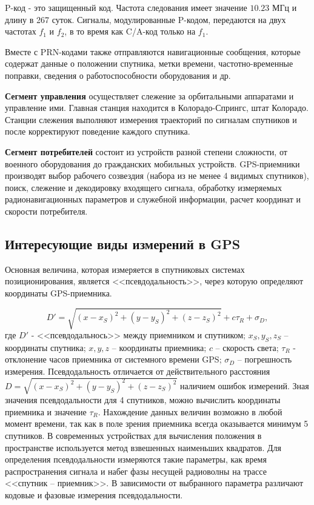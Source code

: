 \documentclass[14pt]{article}
\begin{document}
P-код - это защищенный код. Частота следования имеет значение $10.23 \text{ МГц}$ и длину в 267 суток. Сигналы, модулированные P-кодом, передаются на двух частотах $f_1$ и $f_2$, в то время как C/A-код только на $f_1$.

Вместе с PRN-кодами также отправляются навигационные сообщения, которые содержат данные о положении спутника, метки времени, частотно-временные поправки, сведения о работоспособности оборудования и др.

\textbf{Сегмент управления} осуществляет слежение за орбитальными аппаратами и управление ими. Главная станция находится в Колорадо-Спрингс, штат Колорадо. Станции слежения выполняют измерения траекторий по сигналам спутников и после корректируют поведение каждого спутника.

\textbf{Сегмент потребителей} состоит из устройств разной степени сложности, от военного оборудования до гражданских мобильных устройств. GPS-приемники производят выбор рабочего созвездия (набора из не менее 4 видимых спутников), поиск, слежение и декодировку входящего сигнала, обработку измеряемых радионавигационных параметров и служебной информации, расчет координат и скорости потребителя.

\subsection{Интересующие виды измерений в GPS}
Основная величина, которая измеряется в спутниковых системах позиционирования, является <<псевдодальность>>, через которую определяют координаты GPS-приемника.

\begin{equation}
D' = \sqrt{(x - x_S)^2 + (y - y_S)^2 + (z - z_S)^2} + c\tau_R +\sigma_D,
\end{equation}
где $D'$ - <<псевдодальнось>> между приемником и спутником; $x_S, y_S, z_S$ -- координаты спутника; $x, y, z$ -- координаты приемника; $c$ -- скорость света; $\tau_R$ - отклонение часов приемника от системного времени GPS; $\sigma_D$ -- погрешность измерения. 
Псевдодальность отличается от действительного расстояния $D = \sqrt{(x - x_S) ^ 2 + (y - y_S) ^ 2 + (z - z_S) ^ 2}$ наличием ошибок измерений. 
Зная значения псевдодальности для 4 спутников, можно вычислить координаты приемника и значение $\tau_R$. Нахождение данных величин возможно в любой момент времени, так как в поле зрения приемника всегда оказывается минимум 5 спутников. В современных устройствах для вычисления положения в пространстве используется метод взвешенных наименьших квадратов. Для определения псевдодальности измеряются такие параметры, как время распространения сигнала и набег фазы несущей радиоволны на трассе <<спутник -- приемник>>. В зависимости от выбранного параметра различают кодовые и фазовые измерения псевдодальности.
\end{document}
